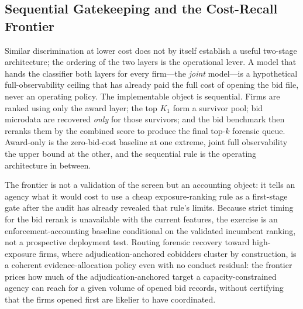 %
\subsection{Sequential Gatekeeping and the Cost-Recall Frontier}
\label{sec:sequential_gatekeeper}

Similar discrimination at lower cost does not by itself establish a
useful two-stage architecture; the ordering of the two layers is the
operational lever. A model that hands the classifier both layers for
every firm---the \emph{joint} model---is a hypothetical
full-observability ceiling that has already paid the full cost of
opening the bid file, never an operating policy. The implementable
object is sequential. Firms are ranked using only the award layer; the
top $K_1$ form a survivor pool; bid microdata are recovered \emph{only}
for those survivors; and the bid benchmark then reranks them by the
combined score to produce the final top-$k$ forensic queue. Award-only
is the zero-bid-cost baseline at one extreme, joint full observability
the upper bound at the other, and the sequential rule is the operating
architecture in between.

The frontier is not a validation of the screen but an accounting
object: it tells an agency what it would cost to use a cheap
exposure-ranking rule as a first-stage gate after the audit has already
revealed that rule's limits. Because strict timing for the bid rerank
is unavailable with the current features, the exercise is an
enforcement-accounting baseline conditional on the validated incumbent
ranking, not a prospective deployment test. Routing forensic recovery
toward high-exposure firms, where adjudication-anchored cobidders
cluster by construction, is a coherent evidence-allocation policy even
with no conduct residual: the frontier prices how much of the
adjudication-anchored target a capacity-constrained agency can reach for
a given volume of opened bid records, without certifying that the firms
opened first are likelier to have coordinated.

